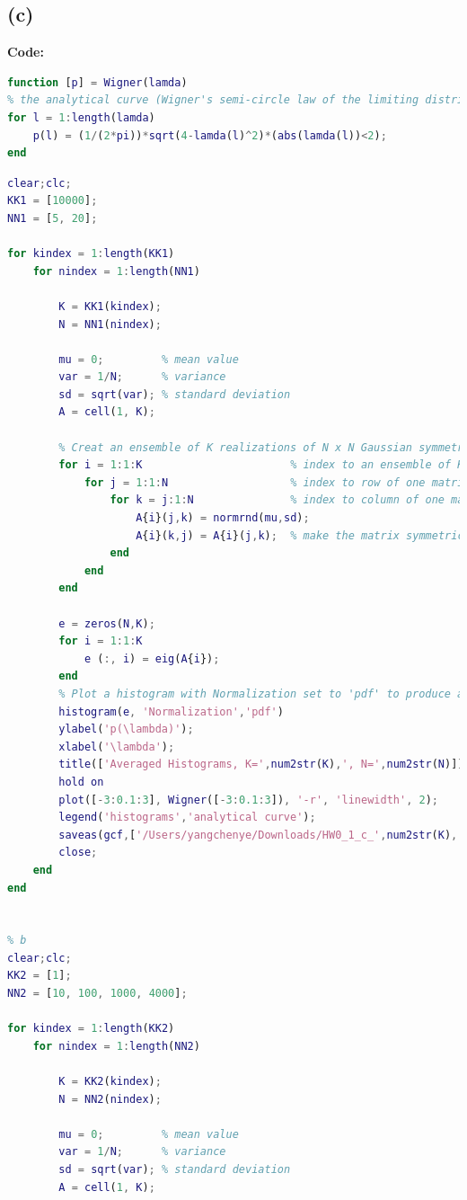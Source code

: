 \documentclass[twoside]{homework}
\begin{document}
\subsection*{(c)}
\textbf{Code:}
\begin{lstlisting}[language={Matlab}]
function [p] = Wigner(lamda)
% the analytical curve (Wigner's semi-circle law of the limiting distribution)
for l = 1:length(lamda)
    p(l) = (1/(2*pi))*sqrt(4-lamda(l)^2)*(abs(lamda(l))<2);
end
\end{lstlisting}
\begin{lstlisting}[language={Matlab}]
% a
clear;clc;
KK1 = [10000];
NN1 = [5, 20];

for kindex = 1:length(KK1)
    for nindex = 1:length(NN1)
        
        K = KK1(kindex);
        N = NN1(nindex);

        mu = 0;         % mean value
        var = 1/N;      % variance
        sd = sqrt(var); % standard deviation 
        A = cell(1, K);

        % Creat an ensemble of K realizations of N x N Gaussian symmetric matrices
        for i = 1:1:K                       % index to an ensemble of K realizations
            for j = 1:1:N                   % index to row of one matrix
                for k = j:1:N               % index to column of one matrix
                    A{i}(j,k) = normrnd(mu,sd);
                    A{i}(k,j) = A{i}(j,k);  % make the matrix symmetric
                end
            end
        end

        e = zeros(N,K);
        for i = 1:1:K
            e (:, i) = eig(A{i});
        end
        % Plot a histogram with Normalization set to 'pdf' to produce an estimation of the probability density function.
        histogram(e, 'Normalization','pdf')
        ylabel('p(\lambda)');
        xlabel('\lambda');
        title(['Averaged Histograms, K=',num2str(K),', N=',num2str(N)]);
        hold on
        plot([-3:0.1:3], Wigner([-3:0.1:3]), '-r', 'linewidth', 2);
        legend('histograms','analytical curve');
        saveas(gcf,['/Users/yangchenye/Downloads/HW0_1_c_',num2str(K),'_',num2str(N),'.png'])
        close;
    end
end


% b
clear;clc;
KK2 = [1];
NN2 = [10, 100, 1000, 4000];

for kindex = 1:length(KK2)
    for nindex = 1:length(NN2)
        
        K = KK2(kindex);
        N = NN2(nindex);

        mu = 0;         % mean value
        var = 1/N;      % variance
        sd = sqrt(var); % standard deviation 
        A = cell(1, K);


\end{lstlisting}
\end{document}
